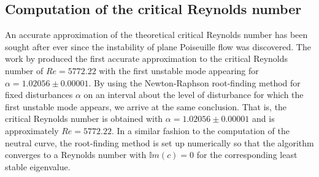 \documentclass[a4paper, 12pt, twoside, openright]{article}
\numberwithin{equation}{section}
\begin{document}
\subsection{Computation of the critical Reynolds number}


An accurate approximation of the theoretical critical Reynolds number has been sought after ever since the instability of plane Poiseuille flow was discovered. The work by \cite{Orszag71} produced the first accurate approximation to the critical Reynolds number of $Re=5772.22$ with the first unstable mode appearing for $\alpha=1.02056\pm0.00001$. By using the Newton-Raphson root-finding method for fixed disturbances $\alpha$ on an interval about the level of disturbance for which the first unstable mode appears, we arrive at the same conclusion. That is, the critical Reynolds number is obtained with $\alpha=1.02056\pm0.00001$ and is approximately $Re=5772.22$. In a similar fashion to the computation of the neutral curve, the root-finding method is set up numerically so that the algorithm converges to a Reynolds number with $\mathbb{I}m(c)=0$ for the corresponding least stable eigenvalue.%
\end{document}
